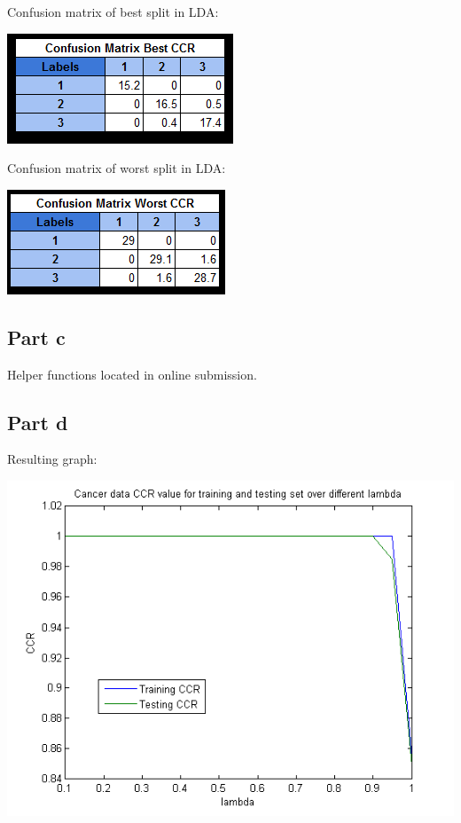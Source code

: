 \documentclass[paper=a4, fontsize=11pt]{scrartcl} %
\numberwithin{equation}{section} %
\numberwithin{figure}{section} %
\numberwithin{table}{section} %
\begin{document}
	Confusion matrix of best split in LDA:
	
	\includegraphics{best_conf_mat}
	
	Confusion matrix of worst split in LDA:
	
	\includegraphics{worst_conf_mat}
	
	\subsection{Part c}
	Helper functions located in online submission.
	
	\subsection{Part d}
	Resulting graph:
	
	\includegraphics{1d_graph}
	
	
\end{document}
